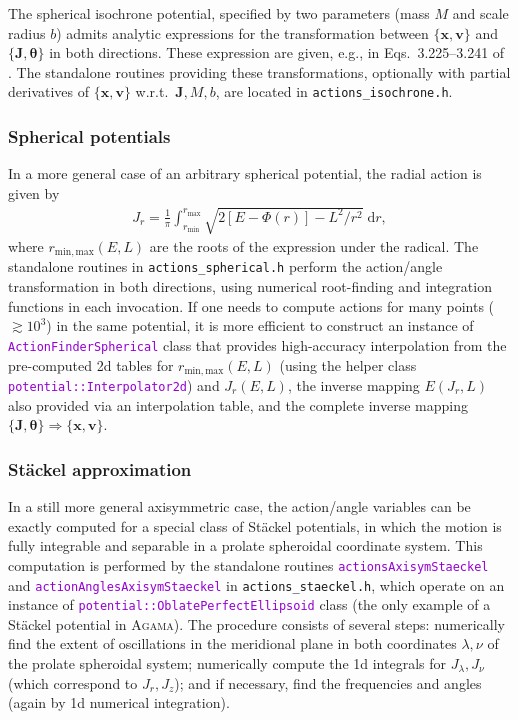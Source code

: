 \documentclass[12pt]{article}
\newcommand{\Agama}{\textsc{Agama}\xspace}
\newcommand{\ttt}[1]{\textcolor{darkviolet}{\texttt{#1}}}
\renewcommand{\d}{\mathrm{d}}
\newcommand{\bv}{\boldsymbol{v}}
\newcommand{\bx}{\boldsymbol{x}}
\newcommand{\bJ}{\boldsymbol{J}}
\newcommand{\bt}{\boldsymbol{\theta}}
\begin{document}
The spherical isochrone potential, specified by two parameters (mass $M$ and scale radius $b$) admits analytic expressions for the transformation between $\{\bx,\bv\}$ and $\{\bJ,\bt\}$ in both directions. These expression are given, e.g., in Eqs.~3.225--3.241 of \cite{BinneyTremaine}.
The standalone routines providing these transformations, optionally with partial derivatives of $\{\bx,\bv\}$ w.r.t.\ $\bJ, M, b$, are located in \texttt{actions_isochrone.h}.


\subsubsection{Spherical potentials}  \label{sec:ActionsSpherical}

In a more general case of an arbitrary spherical potential, the radial action is given by 
\begin{align*}
J_r = \frac{1}{\pi} \int_{r_\mathrm{min}}^{r_\mathrm{max}} \sqrt{2[E-\Phi(r)] - L^2/r^2}\;\d r,
\end{align*}
where $r_\mathrm{min,max}(E,L)$ are the roots of the expression under the radical.
The standalone routines in \texttt{actions_spherical.h} perform the action/angle transformation in both directions, using numerical root-finding and integration functions in each invocation. If one needs to compute actions for many points ($\gtrsim 10^3$) in the same potential, it is more efficient to construct an instance of \ttt{ActionFinderSpherical} class that provides high-accuracy interpolation from the pre-computed 2d tables for $r_\mathrm{min,max}(E,L)$ (using the helper class \ttt{potential::Interpolator2d}) and $J_r(E,L)$, the inverse mapping $E(J_r,L)$ also provided via an interpolation table, and the complete inverse mapping $\{\bJ,\bt\} \Rightarrow \{\bx,\bv\}$.


\subsubsection{St\"ackel approximation}  \label{sec:ActionsStaeckel}

In a still more general axisymmetric case, the action/angle variables can be exactly computed for a special class of St\"ackel potentials, in which the motion is fully integrable and separable in a prolate spheroidal coordinate system. This computation is performed by the standalone routines \ttt{actionsAxisymStaeckel} and \ttt{actionAnglesAxisymStaeckel} in \mbox{\texttt{actions_staeckel.h}}, which operate on an instance of \ttt{potential::OblatePerfectEllipsoid} class (the only example of a St\"ackel potential in \Agama). The procedure consists of several steps: numerically find the extent of oscillations in the meridional plane in both coordinates $\lambda, \nu$ of the prolate spheroidal system; numerically compute the 1d integrals for $J_\lambda, J_\nu$ (which correspond to $J_r, J_z$); and if necessary, find the frequencies and angles (again by 1d numerical integration).
\end{document}
